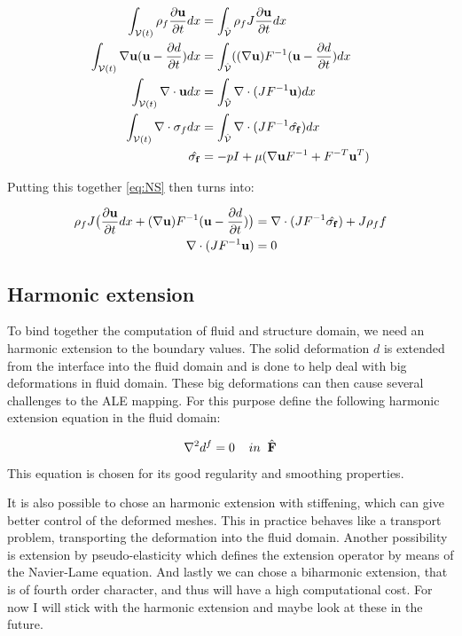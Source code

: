 \begin{align}
\int_{\mathcal{V}(t)} \rho_f \frac{\partial \bold{u}}{\partial t} dx & = \int_{\hat{\mathcal{V}}}  \rho_f J \frac{\partial \bold{u}}{\partial t} dx \\
\int_{\mathcal{V}(t)} \nabla \bold{u} (\bold{u}-\frac{\partial d}{\partial t}) dx  &= \int_{\hat{\mathcal{V}}} ((\nabla \bold{u})F^{-1}(\bold{u}-\frac{\partial d}{\partial t}) dx  \\
\int_{\mathcal{V}(t)} \nabla \cdot \bold{u} dx  &=\int_{\hat{\mathcal{V}}}  \nabla \cdot (J F^{-1} \bold{u}  ) dx \\
\int_{\mathcal{V}(t)} \nabla \cdot \sigma_f dx &= \int_{\hat{\mathcal{V}}} \nabla \cdot( J F^{-1} \hat{\sigma_f} )     dx \\
\hat{\sigma_f} &= -pI + \mu ( \nabla \bold{u} F^{-1} + F^{-T} \bold{u}^{T}  ) 
\end{align}

Putting this together \eqref{eq:NS} then turns into:

\begin{align}
\label{eq:NS_mapped}
\rho_f J \big( \frac{\partial \bold{u}}{\partial t} dx + (\nabla \bold{u})F^{-1}(\bold{u}-\frac{\partial d}{\partial t}) \big) &= \nabla \cdot( J F^{-1} \hat{\sigma_f} ) + J \rho_f f \\
\nabla \cdot (J F^{-1} \bold{u} ) &= 0
\end{align} 

\subsection*{Harmonic extension}
To bind together the computation of fluid and structure domain, we need an harmonic extension to the boundary values. The solid deformation $d$ is extended from the interface into the fluid domain and is done to help deal with big deformations in fluid domain. These big deformations can then cause several challenges to the ALE mapping. 
For this purpose define the following harmonic extension equation in the fluid domain:

\begin{equation}
\nabla^2 d^f = 0\hspace{4mm}in \hspace{2mm} \mathcal{\hat{F}}
\end{equation}

This equation is chosen for its good regularity and smoothing properties.

It is also possible to chose an harmonic extension with stiffening, which can give better control of the deformed meshes. This in practice behaves like a transport problem, transporting the deformation into the fluid domain. Another possibility is extension by pseudo-elasticity which defines the extension operator by means of the Navier-Lame equation. And lastly we can chose a biharmonic extension, that is of fourth order character, and thus will have a high computational cost. For now I will stick with the harmonic extension and maybe look at these in the future. \cite{Richter2016}

